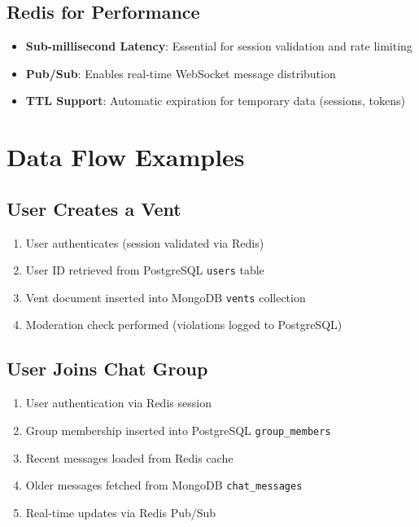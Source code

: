\documentclass[11pt,a4paper]{article}
\begin{document}
\subsection{Redis for Performance}
\begin{itemize}
    \item \textbf{Sub-millisecond Latency}: Essential for session validation and rate limiting
    \item \textbf{Pub/Sub}: Enables real-time WebSocket message distribution
    \item \textbf{TTL Support}: Automatic expiration for temporary data (sessions, tokens)
\end{itemize}

\section{Data Flow Examples}

\subsection{User Creates a Vent}
\begin{enumerate}
    \item User authenticates (session validated via \textcolor{redisred}{Redis})
    \item User ID retrieved from \textcolor{postgresblue}{PostgreSQL} \texttt{users} table
    \item Vent document inserted into \textcolor{mongogreen}{MongoDB} \texttt{vents} collection
    \item Moderation check performed (violations logged to \textcolor{postgresblue}{PostgreSQL})
\end{enumerate}

\subsection{User Joins Chat Group}
\begin{enumerate}
    \item User authentication via \textcolor{redisred}{Redis} session
    \item Group membership inserted into \textcolor{postgresblue}{PostgreSQL} \texttt{group\_members}
    \item Recent messages loaded from \textcolor{redisred}{Redis} cache
    \item Older messages fetched from \textcolor{mongogreen}{MongoDB} \texttt{chat\_messages}
    \item Real-time updates via \textcolor{redisred}{Redis} Pub/Sub
\end{enumerate}
\end{document}

